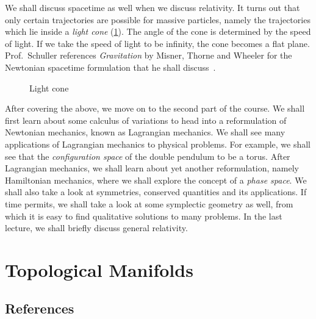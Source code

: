 \documentclass[a4paper, 11pt]{book}
\theoremstyle{definition}
\begin{document}
    We shall discuss spacetime as well when we discuss relativity. It turns out that only certain trajectories are possible for massive particles, namely the trajectories which lie inside a \textit{light cone} (\cref{fig:lightcone}). The angle of the cone is determined by the speed of light. If we take the speed of light to be infinity, the cone becomes a flat plane. Prof.\ Schuller references \textit{Gravitation} by Misner, Thorne and Wheeler for the Newtonian spacetime formulation that he shall discuss~\cite{Misner}.

    \begin{figure}[htb]
        \centering
        \caption{Light cone}
        \label{fig:lightcone}
    \end{figure}

    After covering the above, we move on to the second part of the course. We shall first learn about some calculus of variations to head into a reformulation of Newtonian mechanics, known as Lagrangian mechanics. We shall see many applications of Lagrangian mechanics to physical problems. For example, we shall see that the \textit{configuration space} of the double pendulum to be a torus. After Lagrangian mechanics, we shall learn about yet another reformulation, namely Hamiltonian mechanics, where we shall explore the concept of a \textit{phase space}. We shall also take a look at symmetries, conserved quantities and its applications. If time permits, we shall take a look at some symplectic geometry as well, from which it is easy to find qualitative solutions to many problems. In the last lecture, we shall briefly discuss general relativity.

    \chapter{Topological Manifolds}

    \section{References}
\end{document}
